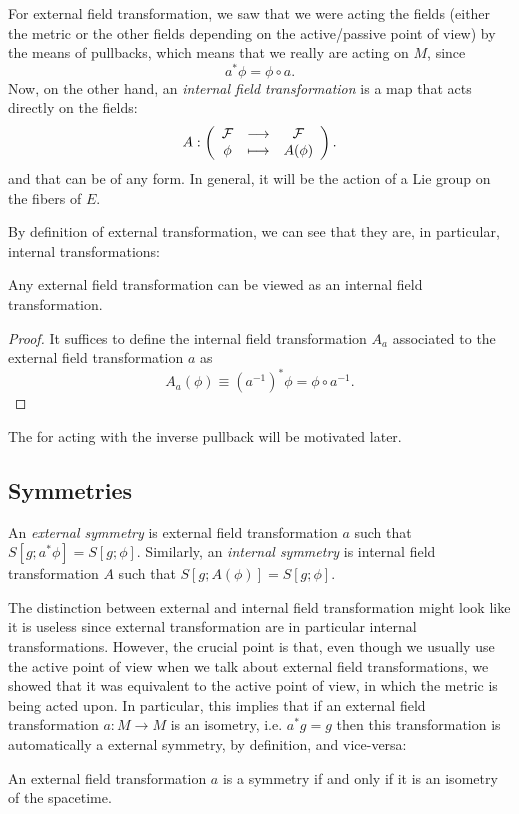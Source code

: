\documentclass[a4paper,10pt]{article}
\begin{document}
        For external field transformation, we saw that we were acting the fields (either the metric or the other fields depending on the active/passive point of view) by the means of pullbacks, which means that we really are acting on $M$, since
        \begin{equation}
            a^*\phi=\phi\circ a.
        \end{equation}
        Now, on the other hand, an \emph{internal field transformation} is a map that acts directly on the fields:
        \begin{equation}
            A:\left(
            \begin{array}{ccc}
                \mathcal{F} & \longrightarrow & \mathcal{F} \\
                \phi & \longmapsto & A(\phi)
            \end{array}\right).
        \end{equation}
        and that can be of any form. In general, it will be the action of a Lie group on the fibers of $E$.

        By definition of external transformation, we can see that they are, in particular, internal transformations:
        \begin{prop}
            Any external field transformation can be viewed as an internal field transformation.
        \end{prop}
        \begin{proof}
            It suffices to define the internal field transformation $A_a$ associated to the external field transformation $a$ as
            \begin{equation}
                A_a(\phi)\equiv(a^{-1})^*\phi=\phi\circ a^{-1}.
            \end{equation}
        \end{proof}
        The for acting with the inverse pullback will be motivated later.

    \subsection{Symmetries}

        An \emph{external symmetry} is external field transformation $a$ such that $S[g;a^*\phi]=S[g;\phi]$. Similarly, an \emph{internal symmetry} is internal field transformation $A$ such that $S[g;A(\phi)]=S[g;\phi]$.

        The distinction between external and internal field transformation might look like it is useless since external transformation are in particular internal transformations. However, the crucial point is that, even though we usually use the active point of view when we talk about external field transformations, we showed that it was equivalent to the active point of view, in which the metric is being acted upon. In particular, this implies that if an external field transformation $a:M\to M$ is an isometry, i.e. $a^*g=g$ then this transformation is automatically a external symmetry, by definition, and vice-versa:
        \begin{prop}
            An external field transformation $a$ is a symmetry if and only if it is an isometry of the spacetime.
        \end{prop}
\end{document}
